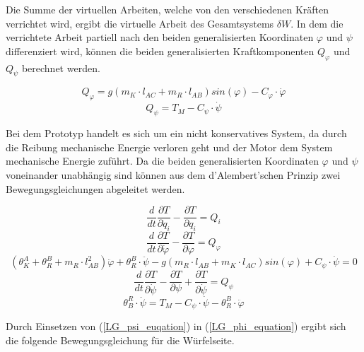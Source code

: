 Die Summe der virtuellen Arbeiten, welche von den verschiedenen Kräften verrichtet wird, ergibt die virtuelle Arbeit des Gesamtsystems $\delta W$. In dem die verrichtete Arbeit partiell nach den beiden generalisierten Koordinaten $\varphi$ und $\psi$ differenziert wird, können die beiden generalisierten Kraftkomponenten $Q_{\varphi}$ und $Q_{\psi}$ berechnet werden.

\begin{equation}
Q_{\varphi} = g(m_K \cdot l_{AC} + m_R \cdot l_{AB})sin(\varphi) - C_{\varphi} \cdot \dot{\varphi}
\end{equation}
\begin{equation}
Q_{\psi} = T_M - C_{\psi} \cdot \dot{\psi}
\end{equation}


Bei dem Prototyp handelt es sich um ein nicht konservatives System, da durch die Reibung mechanische Energie verloren geht und der Motor dem System mechanische Energie zuführt. Da die beiden generalisierten Koordinaten $\varphi$ und $\psi$ voneinander unabhängig sind können aus dem d'Alembert'schen Prinzip zwei Bewegungsgleichungen abgeleitet werden.

\begin{equation}
\frac{d}{dt}\frac{\partial T}{\partial \dot{q}_i}-\frac{\partial T}{\partial q_i} = Q_i
\end{equation}
\begin{equation}
\frac{d}{dt}\frac{\partial T}{\partial \dot{\varphi}}-\frac{\partial T}{\partial \varphi} = Q_{\varphi} 
\end{equation}
\begin{equation}
\label{LG_phi_equation}
({\theta}^A_K + {\theta}^B_R + m_R \cdot l_{AB}^2)\ddot{\varphi} + {\theta}^B_R \cdot \ddot{\psi} - g(m_R \cdot l_{AB} + m_K \cdot l_{AC})sin(\varphi) + C_{\psi} \cdot \dot{\psi} = 0
\end{equation}
\begin{equation}
\frac{d}{dt}\frac{\partial T}{\partial \dot{\psi}}-\frac{\partial T}{\partial \psi} + \frac{\partial T}{\partial \dot{\psi}} = Q_{\psi} 
\end{equation}
\begin{equation}
\label{LG_psi_euqation}
{\theta}^R_B \cdot \ddot{\psi} = T_M - C_{\psi} \cdot \dot{\psi} - {\theta}^B_R \cdot \ddot{\varphi}
\end{equation}

Durch Einsetzen von (\ref{LG_psi_euqation}) in (\ref{LG_phi_equation}) ergibt sich die folgende Bewegungsgleichung für die Würfelseite.


